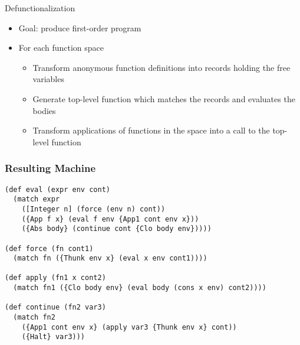 \documentclass{beamer}
\begin{document}
\begin{frame}{Defunctionalization}
  \begin{itemize}
    \item Goal: produce first-order program
    \item For each function space
    \begin{itemize}
      \item Transform anonymous function definitions into records holding the free variables
      \item Generate top-level function which matches the records and evaluates the bodies
      \item Transform applications of functions in the space into a call to the top-level function
    \end{itemize}
  \end{itemize}
\end{frame}

\begin{frame}[fragile]
  \frametitle{Resulting Machine}
  \begin{lstlisting}
(def eval (expr env cont)
  (match expr
    ([Integer n] (force (env n) cont))
    ({App f x} (eval f env {App1 cont env x}))
    ({Abs body} (continue cont {Clo body env}))))

(def force (fn cont1)
  (match fn ({Thunk env x} (eval x env cont1))))

(def apply (fn1 x cont2)
  (match fn1 ({Clo body env} (eval body (cons x env) cont2))))

(def continue (fn2 var3)
  (match fn2
    ({App1 cont env x} (apply var3 {Thunk env x} cont))
    ({Halt} var3)))
  \end{lstlisting}
\end{frame}
\end{document}
